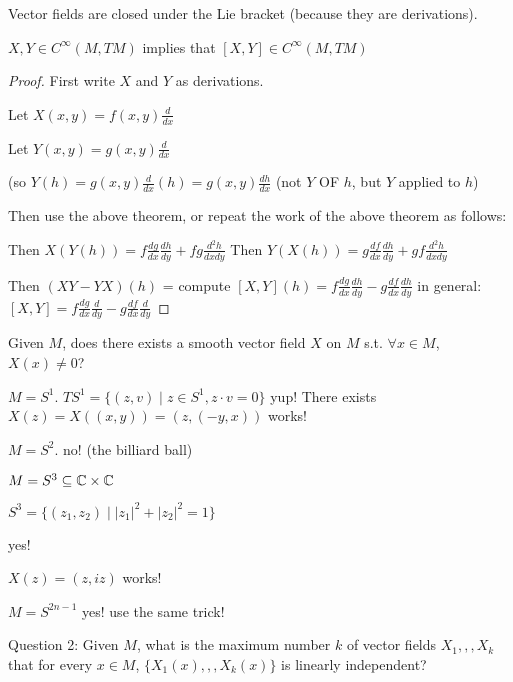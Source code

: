 \documentclass[11pt]{amsbook}
\newenvironment{dateenv}{
	\vspace{1em}
}{
	\vspace{1em}
}
\newcommand{\mydate}[4]{
	\newdate{#1}{#2}{#3}{#4}
	\begin{dateenv}
		\hfill\displaydate{#1}
	\end{dateenv}
}
\theoremstyle{mystyle} %
\numberwithin{thm}{section}
\newcommand{\x}{\times}
\begin{document}
\begin{example}
	Vector fields are closed under the Lie bracket (because they are derivations).

	$X, Y \in C^\infty(M, TM)$ implies that $[X,Y] \in C^\infty(M, TM)$
\end{example}
\begin{proof}
	First write $X$ and $Y$ as derivations.

	Let $X(x,y) = f(x,y)\frac{d}{dx}$

	Let $Y(x,y) = g(x,y)\frac{d}{dx}$

	(so $Y(h) = g(x,y)\frac{d}{dx}(h) = g(x,y)\frac{dh}{dx}$  (not $Y$ OF $h$, but $Y$ applied to $h$)

Then use the above theorem, or repeat the work of the above theorem as follows:

	Then $X(Y(h)) = f \frac{dg}{dx} \frac{dh}{dy} + fg \frac{d^2h}{dxdy}$
	Then $Y(X(h)) = g \frac{df}{dx} \frac{dh}{dy} + gf \frac{d^2h}{dxdy}$

	Then $(XY - YX)(h)$ = compute
	$[X,Y](h) = f \frac{dg}{dx} \frac{dh}{dy} - g \frac{df}{dx} \frac{dh}{dy}$
	in general:
	$[X,Y] = f \frac{dg}{dx} \frac{d}{dy} - g \frac{df}{dx} \frac{d}{dy}$
\end{proof}

\mydate{d6}{12}{10}{2016}

Given $M$, does there exists a smooth vector field $X$ on $M$ s.t. $\forall x \in M$, $X(x) \neq 0$?

\begin{example}
	$M = S^1$.  $TS^1 = \{ (z,v) \mid z \in S^1, z \cdot v = 0 \}$
	yup!  There exists
	$X(z) = X((x,y)) = (z, (-y,x))$ works!
\end{example}
\begin{example}
	$M = S^2$.
	no! (the billiard ball)
\end{example}
\begin{example}
	$M = S^3 \subseteq \C \x \C$

	$S^3 = \{ (z_1,z_2) \mid |z_1|^2 + |z_2|^2 = 1 \}$

	yes!

	$X(z) = (z, iz)$ works!
\end{example}
\begin{example}
	$M = S^{2n-1}$
	yes!
	use the same trick!
\end{example}
Question 2:
Given $M$, what is the maximum number $k$ of vector fields $X_1,,,X_k$ that for every $x \in M$, $\{X_1(x),,,X_k(x)\}$ is linearly independent?
\end{document}

